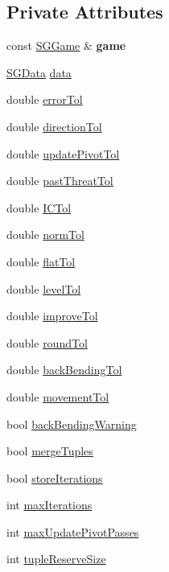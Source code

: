 \subsection*{Private Attributes}
\begin{DoxyCompactItemize}
\item 
\hypertarget{class_s_g_solver_ad9b23110fabeeb58f19729017d56c792}{const \hyperlink{class_s_g_game}{S\+G\+Game} \& {\bfseries game}}\label{class_s_g_solver_ad9b23110fabeeb58f19729017d56c792}

\item 
\hyperlink{class_s_g_data}{S\+G\+Data} \hyperlink{class_s_g_solver_a83e1c54773913a937f44d55772f2e69f}{data}
\item 
double \hyperlink{class_s_g_solver_a99002245a75f22ec160c47423001ab8a}{error\+Tol}
\item 
double \hyperlink{class_s_g_solver_a2bd9962c5c18abb454ca1650465abefb}{direction\+Tol}
\item 
double \hyperlink{class_s_g_solver_a04879f5038b676bd1a947966750532ad}{update\+Pivot\+Tol}
\item 
double \hyperlink{class_s_g_solver_ad28b55baedb592f299009f606a19237a}{past\+Threat\+Tol}
\item 
double \hyperlink{class_s_g_solver_a127cdfd93f11f83ae3a08342a0dc8ca3}{I\+C\+Tol}
\item 
double \hyperlink{class_s_g_solver_a85a9df04ac9b440de3c8ce500b31e5e4}{norm\+Tol}
\item 
double \hyperlink{class_s_g_solver_ae0fa0fb7546a55acbf743d2ab078f2fe}{flat\+Tol}
\item 
double \hyperlink{class_s_g_solver_a7e4e10386d8b8256f9fed6b6d2fa75de}{level\+Tol}
\item 
double \hyperlink{class_s_g_solver_ae71928b4061d7b054f7051c91fd16a14}{improve\+Tol}
\item 
double \hyperlink{class_s_g_solver_aa87ee9134ca87c67038cadb61d4cc8d0}{round\+Tol}
\item 
double \hyperlink{class_s_g_solver_a58acc9239deaff33ccfa2f3956466f37}{back\+Bending\+Tol}
\item 
double \hyperlink{class_s_g_solver_afff01bc0ddca3d42a50bd13f99d6553d}{movement\+Tol}
\item 
bool \hyperlink{class_s_g_solver_a55e60a2b64baf525b826a4cff816f653}{back\+Bending\+Warning}
\item 
bool \hyperlink{class_s_g_solver_af25dda99eb759d1fcb58cd0d98f9a4c2}{merge\+Tuples}
\item 
bool \hyperlink{class_s_g_solver_aedfe0d946d73a4e4af52c5b28624b944}{store\+Iterations}
\item 
int \hyperlink{class_s_g_solver_a8946fb030f52af5bf77a2f519efee20e}{max\+Iterations}
\item 
int \hyperlink{class_s_g_solver_abbdae6d120999a7602967e33d7a5b50e}{max\+Update\+Pivot\+Passes}
\item 
int \hyperlink{class_s_g_solver_a0e68d667b3865d738cdd969cba67d942}{tuple\+Reserve\+Size}
\end{DoxyCompactItemize}
